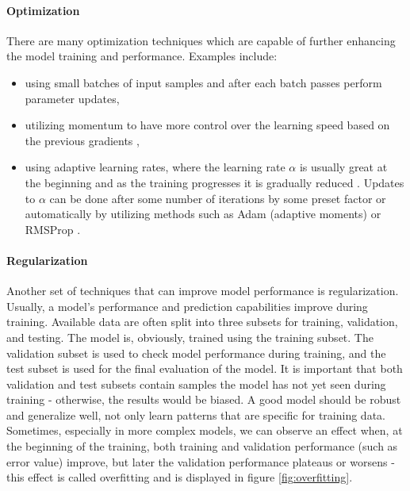 \paragraph{Optimization}
There are many optimization techniques which are capable of further enhancing the model training and performance. Examples include:

\begin{itemize}
    \item using small batches of input samples and after each batch passes perform parameter updates,
    \item utilizing momentum \cite{Polyak1964} to have more control over the learning speed based on the previous gradients \cite{Santosh2022-2},
    \item using adaptive learning rates, where the learning rate $\alpha$ is usually great at the beginning and as the training progresses it is gradually reduced \cite{Santosh2022-2}. Updates to $\alpha$ can be done after some number of iterations by some preset factor or automatically by utilizing methods such as Adam (adaptive moments) \cite{Kingma2014} or RMSProp \cite{Zou2019}.
\end{itemize}

\paragraph{Regularization}
Another set of techniques that can improve model performance is regularization. Usually, a model's performance and prediction capabilities improve during training. Available data are often split into three subsets for training, validation, and testing. The model is, obviously, trained using the training subset. The validation subset is used to check model performance during training, and the test subset is used for the final evaluation of the model. It is important that both validation and test subsets contain samples the model has not yet seen during training - otherwise, the results would be biased. A good model should be robust and generalize well, not only learn patterns that are specific for training data. Sometimes, especially in more complex models, we can observe an effect when, at the beginning of the training, both training and validation performance (such as error value) improve, but later the validation performance plateaus or worsens - this effect is called overfitting \cite{Schaffer1993} and is displayed in figure \ref{fig:overfitting}. 

